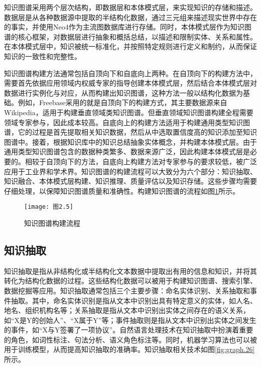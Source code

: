 \documentclass[bachelor_p]{hdu-thesis}
\begin{document}
知识图谱采用两个层次结构，即数据层和本体模式层，来实现知识的存储和描述。数据层是从各种数据源中提取的半结构化数据，通过三元组来描述现实世界中存在的事实，并使用Neo4作为主流图数据库进行存储。同时，本体模式层作为知识图谱的核心框架，对数据层进行抽象和概括总结，以描述和限制实体、关系和属性。在本体模式层中，知识被统一标准化，并按照特定规则进行定义和制约，从而保证知识的一致性和完整性。

知识图谱构建方法通常包括自顶向下和自底向上两种。在自顶向下的构建方法中，需要首先依据应用领域内权威专家的指导创建本体模式层，然后结合本体模式层对数据进行实例化与对应，从而构建出知识图谱，这种方法一般以结构化数据为基础\cite{mastersthesis24}。例如，Freebase采用的就是自顶向下的构建方式，其主要数据源来自Wikipedia\cite{article25}，适用于构建垂直领域类知识图谱。但垂直领域知识图谱构建全程需要领域专家参与，因此成本较高。自底向上的构建方法适用于构建通用类型知识图谱，它的过程是首先提取相关知识数据，然后从中选取置信度高的知识添加至知识图谱中。接着，根据知识库中的知识总结抽象实体概念，并构建本体模式层。由于通用类型知识图谱包含的数据种类繁多、数据来源广泛，因此构建本体模式层是必要的。相较于自顶向下的方法，自底向上构建方法对专家参与的要求较低，被广泛应用于工业界和学术界。知识图谱的构建流程可以大致分为六个部分：知识抽取、知识融合、本体模式层构建、知识推理、质量评估以及知识存储\cite{mastersthesis26}。这些步骤均需要仔细处理，以保障知识图谱质量和准确性。构建知识图谱的流程如图\ref{fig:graph.25}所示。

\begin{figure}[h]
  \centering
  \texttt{[image: 图2.5]}
  \caption{知识图谱构建流程} \label{fig:graph.25}
\end{figure}

\subsection{知识抽取}
知识抽取是指从非结构化或半结构化文本数据中提取出有用的信息和知识，并将其转化为结构化数据的过程。这些结构化数据可以被用于构建知识图谱、搜索引擎、数据挖掘等应用。知识抽取通常包括三个主要步骤：命名实体识别、关系抽取和事件抽取。其中，命名实体识别是指从文本中识别出具有特定意义的实体，如人名、地名、组织机构名等；关系抽取是指从文本中识别出实体之间存在的语义关系，如“X是Y的创始人”、“X属于Y”等；事件抽取则是指从文本中识别出实体之间发生的事件，如“X与Y签署了一项协议”。自然语言处理技术在知识抽取中扮演着重要的角色，如词性标注、句法分析、语义角色标注等。同时，机器学习算法也可以被用于训练模型，从而提高知识抽取的准确率。知识抽取相关技术如图\ref{fig:graph.26}所示。
\end{document}
